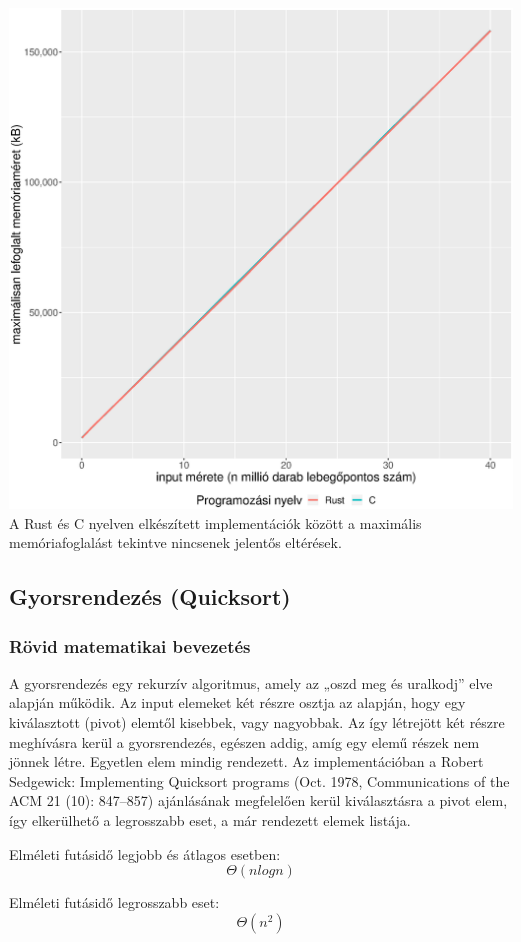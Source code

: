 \includegraphics[width=15.5cm]{kepek/shells_sort_memory.eps}
A Rust és C nyelven elkészített implementációk között a maximális memóriafoglalást tekintve nincsenek jelentős eltérések.

\subsection{Gyorsrendezés (Quicksort)}
\subsubsection{Rövid matematikai bevezetés}
A gyorsrendezés egy rekurzív algoritmus, amely az „oszd meg és uralkodj” elve alapján működik. Az input elemeket két részre osztja az alapján, hogy egy kiválasztott (pivot) elemtől kisebbek, vagy nagyobbak. Az így létrejött két részre meghívásra kerül a gyorsrendezés, egészen addig, amíg egy elemű részek nem jönnek létre. Egyetlen elem mindig rendezett. Az implementációban a Robert Sedgewick: Implementing Quicksort programs (Oct. 1978, Communications of the ACM 21 (10): 847–857) ajánlásának megfelelően kerül kiválasztásra a pivot elem, így elkerülhető a legrosszabb eset, a már rendezett elemek listája.

Elméleti futásidő legjobb és átlagos esetben:
\[\Theta(n log n) \]

Elméleti futásidő legrosszabb eset:
\[\Theta(n^2)\]
 
